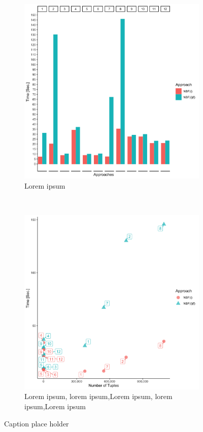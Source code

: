 \begin{figure}[t!]
    \centering
    \begin{subfigure}[t]{0.5\textwidth}
        \centering
        \includegraphics[scale=0.09]{figs/plots/emp-nbfi-comp-f.png}
        \caption{Lorem ipsum}
    \end{subfigure}%
    ~ 
    \begin{subfigure}[t]{0.5\textwidth}
        \centering
        \includegraphics[scale=0.09]{figs/plots/emp-nbfi-f-comp-scatter.png}
        \caption{Lorem ipsum, lorem ipsum,Lorem ipsum, lorem ipsum,Lorem ipsum}
    \end{subfigure}
    \caption{Caption place holder}
\end{figure}

